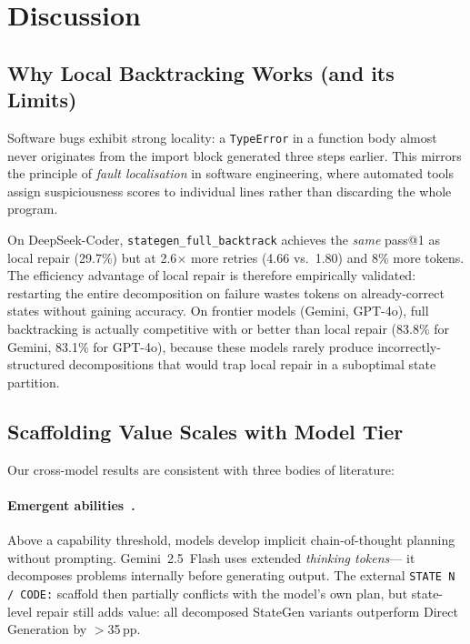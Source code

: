 \documentclass[11pt,twocolumn]{article}
\begin{document}
\section{Discussion}

\subsection{Why Local Backtracking Works (and its Limits)}

Software bugs exhibit strong locality: a \texttt{TypeError} in a function body
almost never originates from the import block generated three steps earlier.
This mirrors the principle of \emph{fault localisation} in software
engineering, where automated tools assign suspiciousness scores to individual
lines rather than discarding the whole program.

On DeepSeek-Coder, \texttt{stategen\_full\_backtrack} achieves the
\emph{same} pass@1 as local repair (29.7\%) but at 2.6$\times$ more retries
(4.66 vs.\ 1.80) and 8\% more tokens. The efficiency advantage of local
repair is therefore empirically validated: restarting the entire decomposition
on failure wastes tokens on already-correct states without gaining accuracy.
On frontier models (Gemini, GPT-4o), full backtracking is actually competitive
with or better than local repair (83.8\% for Gemini, 83.1\% for GPT-4o),
because these models rarely produce incorrectly-structured decompositions that
would trap local repair in a suboptimal state partition.

\subsection{Scaffolding Value Scales with Model Tier}

Our cross-model results are consistent with three bodies of literature:

\paragraph{Emergent abilities~\cite{wei2022emergent}.}
Above a capability threshold, models develop implicit chain-of-thought planning
without prompting. Gemini~2.5~Flash uses extended \emph{thinking tokens}---
it decomposes problems internally before generating output. The external
\texttt{STATE N / CODE:} scaffold then partially conflicts with the model's own
plan, but state-level repair still adds value: all decomposed StateGen variants
outperform Direct Generation by $>$35\,pp.
\end{document}
